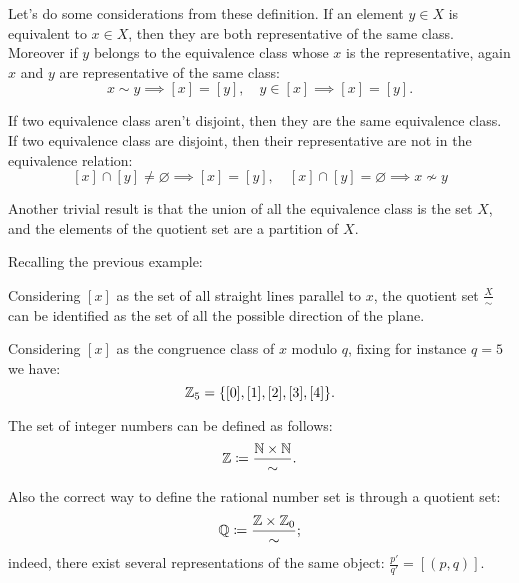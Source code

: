 Let's do some considerations from these definition. If an element $y\in X$ is equivalent to $x\in X$, then they are both representative of the same class. Moreover if $y$ belongs to the equivalence class whose $x$ is the representative, again $x$ and $y$ are representative of the same class:
$$ x \sim y \implies \left[x\right] = \left[y\right], \quad y \in \left[x\right] \implies \left[x\right] = \left[y\right].$$

If two equivalence class aren't disjoint, then they are the same equivalence class. If two equivalence class are disjoint, then their representative are not in the equivalence relation:
$$\left[x\right] \cap \left[y\right] \neq \varnothing \implies \left[x\right] = \left[y\right], \quad \left[x\right] \cap \left[y\right] = \varnothing \implies x \nsim y$$

Another trivial result is that the union of all the equivalence class is the set $X$, and the elements of the quotient set are a partition of $X$.

Recalling the previous example:

\begin{exam}
	Considering $\left[x\right]$ as the set of all straight lines parallel to $x$, the quotient set $\frac{X}{\sim}$ can be identified as the set of all the possible direction of the plane.
\end{exam}		
\begin{exam}
	 Considering $\left[x\right]$ as the congruence class of $x$ modulo $q$, fixing for instance $q=5$ we have:
	 $$
	 	\mathbb Z_5
	 	=\{[0],[1],[2],[3],[4]\}
	 .
	 $$
\end{exam}		
\begin{exam}
	The set of integer numbers can be defined as follows: 
	$$
		\mathbb Z
		\coloneqq \frac{\mathbb N \times \mathbb N}{\sim}
	.
	$$
\end{exam}		
\begin{exam}
	Also the correct way to define the rational number set is through a quotient set: 
	$$
		\mathbb Q 
		\coloneqq \frac{\mathbb Z \times \mathbb Z_0}{\sim}
	;
	$$ 
	indeed, there exist several representations of the same object: $\frac{p'}{q'} = \left[(p,q)\right]$.
\end{exam}


